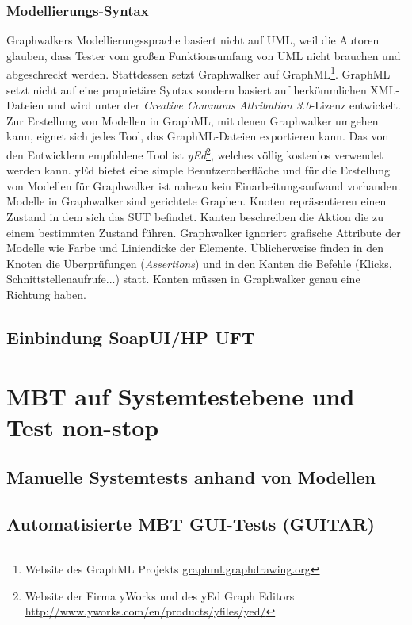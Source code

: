 \subsubsection{Modellierungs-Syntax}
Graphwalkers Modellierungssprache basiert nicht auf UML, weil die Autoren glauben, dass Tester vom großen Funktionsumfang von UML nicht brauchen und abgeschreckt werden. Stattdessen setzt Graphwalker auf GraphML\footnote{Website des GraphML Projekts \url{graphml.graphdrawing.org}}. GraphML setzt nicht auf eine proprietäre Syntax sondern basiert auf herkömmlichen XML-Dateien und wird unter der \textit{Creative Commons Attribution 3.0}-Lizenz entwickelt.\\
Zur Erstellung von Modellen in GraphML, mit denen Graphwalker umgehen kann, eignet sich jedes Tool, das GraphML-Dateien exportieren kann. Das von den Entwicklern empfohlene Tool ist \textit{yEd}\footnote{Website der Firma yWorks und des yEd Graph Editors \url{http://www.yworks.com/en/products/yfiles/yed/}}, welches völlig kostenlos verwendet werden kann. yEd bietet eine simple Benutzeroberfläche und für die Erstellung von Modellen für Graphwalker ist nahezu kein Einarbeitungsaufwand vorhanden.\\
Modelle in Graphwalker sind gerichtete Graphen. Knoten repräsentieren einen Zustand in dem sich das SUT befindet. Kanten beschreiben die Aktion die zu einem bestimmten Zustand führen. Graphwalker ignoriert grafische Attribute der Modelle wie Farbe und Liniendicke der Elemente. Üblicherweise finden in den Knoten die Überprüfungen (\textit{Assertions}) und in den Kanten die Befehle (Klicks, Schnittstellenaufrufe...) statt. Kanten müssen in Graphwalker genau eine Richtung haben.\\

\subsection{Einbindung SoapUI/HP UFT}


\section{MBT auf Systemtestebene und Test non-stop}
\subsection{Manuelle Systemtests anhand von Modellen}
\subsection{Automatisierte MBT GUI-Tests (GUITAR)}
